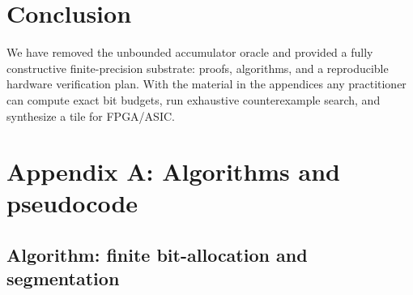 \documentclass[11pt]{article}
\theoremstyle{definition}
\theoremstyle{plain}
\begin{document}
\section{Conclusion}
We have removed the unbounded accumulator oracle and provided a fully constructive finite-precision substrate: proofs, algorithms, and a reproducible hardware verification plan.  With the material in the appendices any practitioner can compute exact bit budgets, run exhaustive counterexample search, and synthesize a tile for FPGA/ASIC.

\appendix
\section{Appendix A: Algorithms and pseudocode}
\label{app:algo}
\subsection{Algorithm: finite bit-allocation and segmentation}
\end{document}
